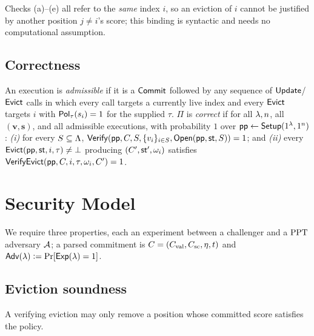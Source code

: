 \begin{remark}
Checks (a)--(e) all refer to the \emph{same} index $i$, so an eviction of $i$
cannot be justified by another position $j\neq i$'s score; this binding is
syntactic and needs no computational assumption.
\end{remark}

\subsection{Correctness}

\begin{definition}[Correctness]\label{def:correct}
An execution is \emph{admissible} if it is a $\mathsf{Commit}$ followed by any sequence
of $\mathsf{Update}$/$\mathsf{Evict}$ calls in which every call targets a currently live index
and every $\mathsf{Evict}$ targets $i$ with $\mathsf{Pol}_\tau(s_i)=1$ for the supplied $\tau$.
$\Pi$ is \emph{correct} if for all $\lambda,n$, all
$(\mathbf{v},\mathbf{s})$, and all admissible executions, with probability $1$
over $\mathsf{pp}\leftarrow\mathsf{Setup}(1^\lambda,1^n)$: \emph{(i)} for every $S\subseteq\Lambda$,
$\mathsf{Verify}(\mathsf{pp},C,S,\{v_i\}_{i\in S},\mathsf{Open}(\mathsf{pp},\mathsf{st},S))=1$; and \emph{(ii)} every
$\mathsf{Evict}(\mathsf{pp},\mathsf{st},i,\tau)\neq\bot$ producing $(C',\mathsf{st}',\omega_i)$ satisfies
$\mathsf{VerifyEvict}(\mathsf{pp},C,i,\tau,\omega_i,C')=1$.
\end{definition}

\section{Security Model}\label{sec:secmodel}

We require three properties, each an experiment between a challenger and a
$\mathrm{PPT}$ adversary $\mathcal{A}$; a parsed commitment is $C=(C_{\mathrm{val}},C_{\mathrm{sc}},\eta,t)$ and
$\mathsf{Adv}(\lambda)\vcentcolon=\Pr[\mathsf{Exp}(\lambda)=1]$.

\subsection{Eviction soundness}
A verifying eviction may only remove a position whose committed score satisfies
the policy.

\medskip
\noindent{}

